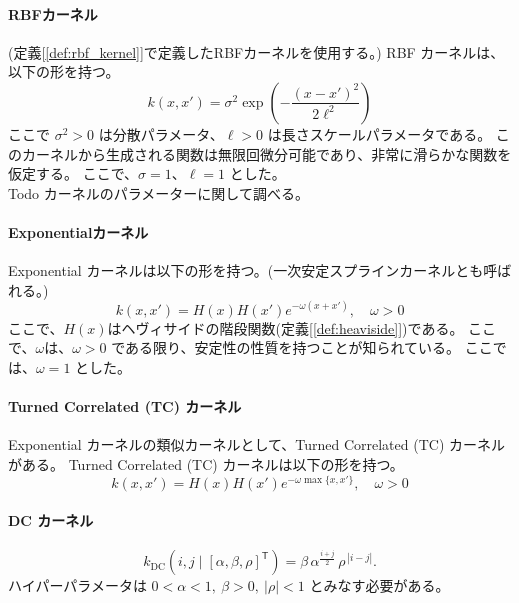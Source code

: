 \paragraph{RBFカーネル}
(定義[\ref{def:rbf_kernel}]で定義したRBFカーネルを使用する。)
RBF カーネルは、以下の形を持つ。
\begin{equation}
k(x,x') = \sigma^2 \exp\left(-\frac{(x-x')^2}{2\ell^2}\right)
\end{equation}
ここで $\sigma^2 > 0$ は分散パラメータ、$\ell > 0$ は長さスケールパラメータである。
このカーネルから生成される関数は無限回微分可能であり、非常に滑らかな関数を仮定する。
ここで、$\sigma = 1$、$\ell = 1$ とした。\\
Todo カーネルのパラメーターに関して調べる。

\paragraph{Exponentialカーネル}
Exponential カーネルは以下の形を持つ。(一次安定スプラインカーネルとも呼ばれる。)
\begin{equation}
k(x, x') = H(x) H(x') e^{-\omega(x + x')}, \quad \omega > 0
\end{equation}
ここで、$H(x)$はヘヴィサイドの階段関数(定義[\ref{def:heaviside}])である。
ここで、$\omega$は、$\omega > 0$ である限り、安定性の性質を持つことが知られている。
\cite[式(4.2)]{dinuzzo2013kernelslineartimeinvariant}
ここでは、$\omega = 1$ とした。

\paragraph{Turned Correlated (TC) カーネル}
Exponential カーネルの類似カーネルとして、Turned Correlated (TC) カーネルがある。
Turned Correlated (TC) カーネルは以下の形を持つ。
\begin{equation}
k(x,x') = H(x) H(x') e^{-\omega \max\{x, x'\}}, \quad \omega > 0
\end{equation}
\cite[式(4.3)]{dinuzzo2013kernelslineartimeinvariant}
\paragraph{DC カーネル}
\begin{equation}
  k_{\mathrm{DC}}\!\left(i,j \mid [\alpha,\beta,\rho]^{\mathsf T}\right)
  = \beta\, \alpha^{\frac{i+j}{2}}\, \rho^{\,|i-j|}.
\end{equation}
ハイパーパラメータは \(0<\alpha<1,\ \beta>0,\ |\rho|<1\) とみなす必要がある。
\cite[式(16)]{337342}
